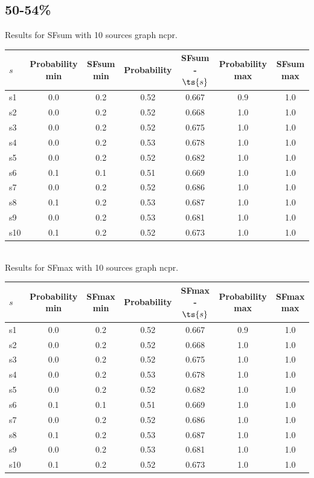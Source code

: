 \documentclass{article}
\begin{document}
\newpage

\subsection{50-54\%}

\noindent Results for SFsum with 10 sources graph ncpr.

\noindent\begin{tabular}{|l|c|c|c|c|c|c|}
\hline
$s$& Probability min & SFsum min & Probability & SFsum - $\ts{s}$ & Probability max & SFsum max\\
\hline
s1 &0.0 & 0.2 & 0.52 & 0.667 & 0.9 & 1.0\\
\hline
s2 &0.0 & 0.2 & 0.52 & 0.668 & 1.0 & 1.0\\
\hline
s3 &0.0 & 0.2 & 0.52 & 0.675 & 1.0 & 1.0\\
\hline
s4 &0.0 & 0.2 & 0.53 & 0.678 & 1.0 & 1.0\\
\hline
s5 &0.0 & 0.2 & 0.52 & 0.682 & 1.0 & 1.0\\
\hline
s6 &0.1 & 0.1 & 0.51 & 0.669 & 1.0 & 1.0\\
\hline
s7 &0.0 & 0.2 & 0.52 & 0.686 & 1.0 & 1.0\\
\hline
s8 &0.1 & 0.2 & 0.53 & 0.687 & 1.0 & 1.0\\
\hline
s9 &0.0 & 0.2 & 0.53 & 0.681 & 1.0 & 1.0\\
\hline
s10 &0.1 & 0.2 & 0.52 & 0.673 & 1.0 & 1.0\\
\hline
\end{tabular}\\

\noindent Results for SFmax with 10 sources graph ncpr.

\noindent\begin{tabular}{|l|c|c|c|c|c|c|}
\hline
$s$& Probability min & SFmax min & Probability & SFmax - $\ts{s}$ & Probability max & SFmax max\\
\hline
s1 &0.0 & 0.2 & 0.52 & 0.667 & 0.9 & 1.0\\
\hline
s2 &0.0 & 0.2 & 0.52 & 0.668 & 1.0 & 1.0\\
\hline
s3 &0.0 & 0.2 & 0.52 & 0.675 & 1.0 & 1.0\\
\hline
s4 &0.0 & 0.2 & 0.53 & 0.678 & 1.0 & 1.0\\
\hline
s5 &0.0 & 0.2 & 0.52 & 0.682 & 1.0 & 1.0\\
\hline
s6 &0.1 & 0.1 & 0.51 & 0.669 & 1.0 & 1.0\\
\hline
s7 &0.0 & 0.2 & 0.52 & 0.686 & 1.0 & 1.0\\
\hline
s8 &0.1 & 0.2 & 0.53 & 0.687 & 1.0 & 1.0\\
\hline
s9 &0.0 & 0.2 & 0.53 & 0.681 & 1.0 & 1.0\\
\hline
s10 &0.1 & 0.2 & 0.52 & 0.673 & 1.0 & 1.0\\
\hline
\end{tabular}\\
\end{document}
